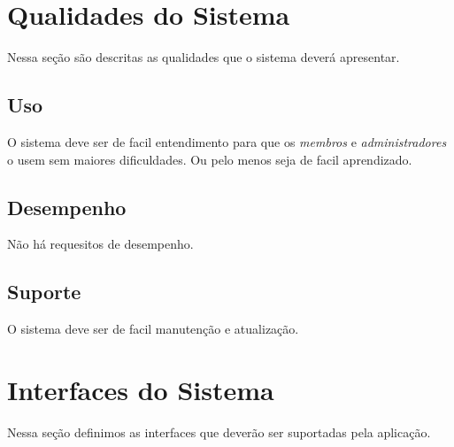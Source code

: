 \documentclass[11pt, a4paper]{article}
\begin{document}
	\section{Qualidades do Sistema}
		Nessa seção são descritas as qualidades que o sistema deverá apresentar.
		
		\subsection{Uso}
			O sistema deve ser de facil entendimento para que os 
			\textit{membros} e \textit{administradores} o usem sem maiores 
			dificuldades. Ou pelo menos seja de facil aprendizado.
		
		
		\subsection{Desempenho}
			Não há requesitos de desempenho. 
		
		\subsection{Suporte}
			O sistema deve ser de facil manutenção e atualização.
		
	\section{Interfaces do Sistema}
		Nessa seção definimos as interfaces que deverão ser suportadas pela 
		aplicação.
		
\end{document}
